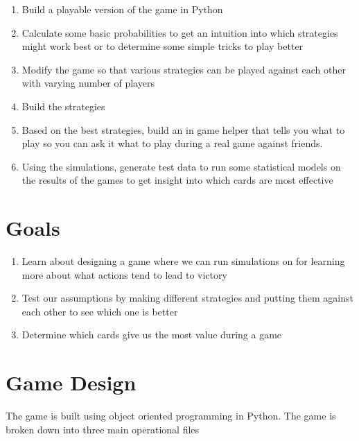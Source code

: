 \documentclass[11pt, oneside]{article}   	%
\begin{document}
	\begin{enumerate}
 		 \item Build a playable version of the game in Python
		 \item Calculate some basic probabilities to get an intuition into which strategies might work best or to determine some simple tricks to play better
		 \item Modify the game so that various strategies can be played against each other with varying number of players
		 \item Build the strategies
		 \item Based on the best strategies, build an in game helper that tells you what to play so you can ask it what to play during a real game against friends.
		 \item Using the simulations, generate test data to run some statistical models on the results of the games to get insight into which cards are most effective
	\end{enumerate}


\section{Goals}

	\begin{enumerate}
 		 \item Learn about designing a game where we can run simulations on for learning more about what actions tend to lead to victory
		 \item Test our assumptions by making different strategies and putting them against each other to see which one is better
		 \item Determine which cards give us the most value during a game
	\end{enumerate}


\section{Game Design}

The game is built using object oriented programming in Python. The game is broken down into three main operational files
\end{document}
